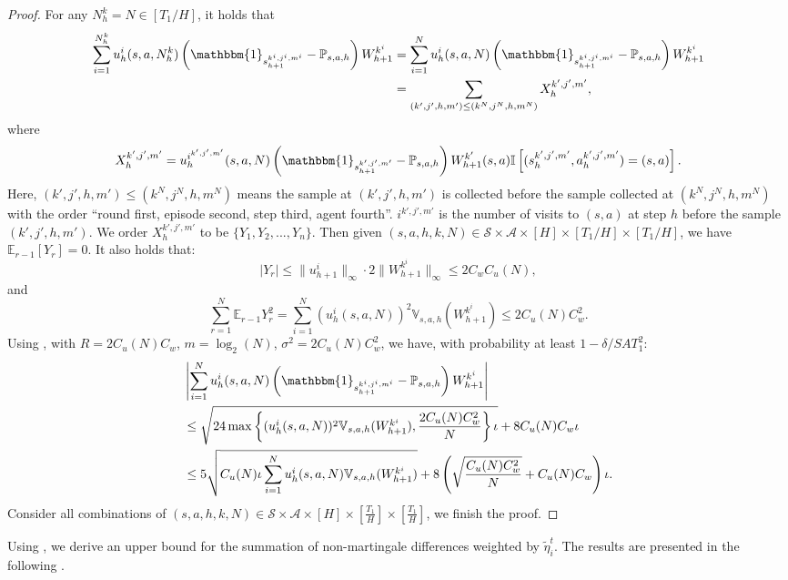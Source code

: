 \documentclass{article}
\newcommand{\sah}{\mathcal{S} \times \mathcal{A} \times [H]}
\begin{document}
\begin{proof}
For any $N_h^k = N \in [T_1/H]$, it holds that
    \begin{align*}
        \sum_{i=1} ^{N_h^k} u_h^i(s,a,N_h^k) \left(\mathbbm{1}_{s_{h+1}^{k^i,j^i,m^i}} - \mathbb{P}_{s,a,h}\right)W_{h+1}^{k^i} 
        &= \sum_{i=1} ^{N} u_h^i(s,a,N) \left(\mathbbm{1}_{s_{h+1}^{k^i,j^i,m^i}} - \mathbb{P}_{s,a,h}\right)W_{h+1}^{k^i} \nonumber\\
        &= \sum_{(k',j',h,m') \leq (k^N,j^N,h,m^N)} X_h^{k',j',m'},
    \end{align*}
    where $$X_h^{k',j',m'} = u_h^{i^{k',j',m'}}(s,a,N)\left(\mathbbm{1}_{s_{h+1}^{k',j',m'}} - \mathbb{P}_{s,a,h}\right)W_{h+1}^{k'}(s,a) \mathbb{I}\left[(s_h^{k',j',m'},a_h^{k',j',m'}) = (s,a)\right].$$
    Here, $(k',j',h,m') \leq (k^N,j^N,h,m^N)$ means the sample at $(k',j',h,m')$ is collected before the sample collected at $(k^N,j^N,h,m^N)$ with the order ``round first, episode second, step third, agent fourth”. $i^{k',j',m'}$ is the number of visits to $(s,a)$ at step $h$ before the sample $(k',j',h,m')$.
    We order $X_h^{k',j',m'}$ to be $\{Y_1,Y_2,...,Y_n\}$. Then given $(s,a,h,k,N) \in \sah \times [T_1/H] \times [T_1/H]$, we have
    $\mathbb{E}_{r-1}[Y_r] = 0.$ It also holds that:
    $$|Y_r| \leq \|u_{h+1}^i\|_\infty \cdot 2\|W_{h+1}^{k^i}\|_\infty \leq 2C_wC_u(N),$$
    and
    $$\sum_{r=1}^N\mathbb{E}_{r-1}Y_r^2 = \sum_{i=1}^N  (u_h^i(s,a,N))^2  \mathbb{V}_{s,a,h}(W_{h+1}^{k^i}) \leq 2C_u(N)C_w^2.$$
    Using , with $R = 2C_u(N)C_w$, $m = \log_2(N)$, $\sigma^2 = 2C_u(N)C_w^2$, we have, with probability at least $1- \delta/ SAT_1^2$:
    \begin{align*}
        &\left|\sum_{i=1} ^{N} u_h^i(s,a,N) \left(\mathbbm{1}_{s_{h+1}^{k^i,j^i,m^i}} - \mathbb{P}_{s,a,h}\right)W_{h+1}^{k^i}\right| \\
        &\leq \sqrt{24\max\left\{(u_h^i(s,a,N))^2  \mathbb{V}_{s,a,h}(W_{h+1}^{k^i}), \frac{2C_u(N)C_w^2}{N} \right\} \iota} +8C_u(N)C_w\iota \\
        &\leq 5\sqrt{C_u(N)\iota \sum_{i=1}^N u_h^i(s,a,N)  \mathbb{V}_{s,a,h}(W_{h+1}^{k^i})} + 8\left(\sqrt{\frac{C_u(N)C_w^2}{N}}+C_u(N)C_w\right)\iota.
    \end{align*}
    Consider all combinations of $(s,a,h,k,N) \in \sah \times [\frac{T_1}{H}] \times [\frac{T_1}{H}]$, we finish the proof.
\end{proof}
Using , we derive an upper bound for the summation of non-martingale differences weighted by  $\tilde{\eta}_i^t$. The results are presented in the following .
\end{document}
